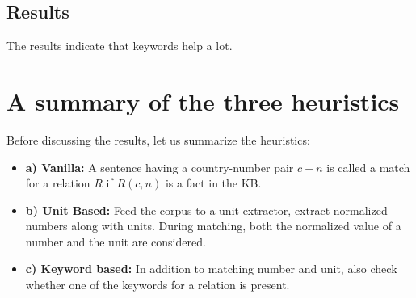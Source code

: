 \documentclass[a4paper,10pt]{article}
\begin{document}
\subsection{Results}
The results indicate that keywords help a lot. 
\begin{table}[H]
\caption{Keyword Based}
\label{fig:kwres}
\end{table}



\section{A summary of the three heuristics}

Before discussing the results, let us summarize the heuristics:
\begin{itemize}
\item \textbf{a) Vanilla:} A sentence having a country-number pair $c-n$ is called a match for a relation $R$ if $R(c,n)$ is a fact in the KB.
\item \textbf{b) Unit Based:} Feed the corpus to a unit extractor, extract normalized numbers along with units. During matching, both the normalized value of a number
and the unit are considered.
\item \textbf{c) Keyword based:} In addition to matching number and unit, also check whether one of the keywords for a relation is present. 
\end{itemize}
\end{document}
